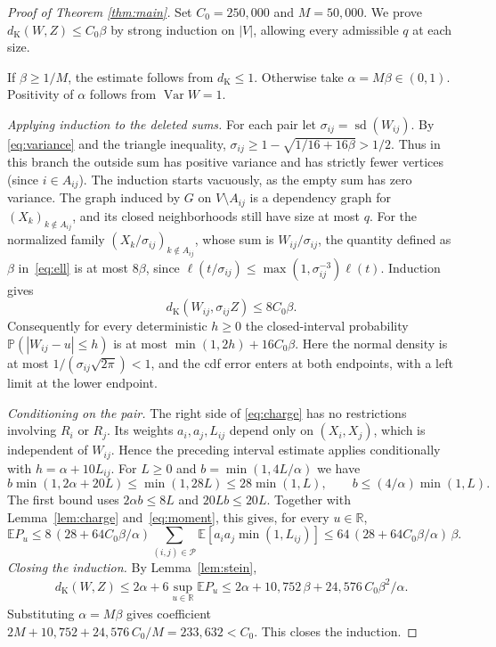 \documentclass[11pt,a4paper]{article}
\newcommand{\E}{\mathbb E}
\newcommand{\PP}{\mathbb P}
\newcommand{\R}{\mathbb R}
\newcommand{\Var}{\operatorname{Var}}
\newcommand{\sd}{\operatorname{sd}}
\newcommand{\dK}{d_{\mathrm K}}
\newcommand{\pairs}{\mathcal P}
\begin{document}
\begin{proof}[Proof of Theorem \ref{thm:main}]
Set $C_0=250{,}000$ and $M=50{,}000$. We prove $\dK(W,Z)\le C_0\beta$ by strong induction on $|V|$, allowing every admissible $q$ at each size.

If $\beta\ge1/M$, the estimate follows from $\dK\le1$. Otherwise take $\alpha=M\beta\in(0,1)$. Positivity of $\alpha$ follows from $\Var W=1$.

\emph{Applying induction to the deleted sums.}
For each pair let $\sigma_{ij}=\sd(W_{ij})$. By \eqref{eq:variance} and the triangle inequality, $\sigma_{ij}\ge1-\sqrt{1/16+16\beta}>1/2$. Thus in this branch the outside sum has positive variance and has strictly fewer vertices
(since $i\in A_{ij}$). The induction starts vacuously, as the empty sum has zero variance. The graph induced by $G$ on $V\setminus A_{ij}$ is a dependency graph for $(X_k)_{k\notin A_{ij}}$, and its closed neighborhoods still have size at most $q$. For the normalized family $(X_k/\sigma_{ij})_{k\notin A_{ij}}$, whose sum is $W_{ij}/\sigma_{ij}$, the quantity defined as $\beta$ in~\eqref{eq:ell} is at most $8\beta$, since $\ell(t/\sigma_{ij})\le\max(1,\sigma_{ij}^{-3})\ell(t)$. Induction gives
\[
 \dK(W_{ij},\sigma_{ij}Z)\le 8C_0\beta .
\]
Consequently for every deterministic $h\ge0$ the closed-interval probability $\PP(|W_{ij}-u|\le h)$ is at most $\min(1,2h)+16C_0\beta$. Here the normal density is at most $1/(\sigma_{ij}\sqrt{2\pi})<1$, and the cdf error enters at both endpoints, with a left limit at the lower endpoint.

\emph{Conditioning on the pair.}
The right side of \eqref{eq:charge} has no restrictions involving $R_i$ or $R_j$. Its weights $a_i,a_j,L_{ij}$ depend only on $(X_i,X_j)$, which is independent of $W_{ij}$. Hence the preceding interval estimate applies conditionally with $h=\alpha+10L_{ij}$. For $L\ge0$ and $b=\min(1,4L/\alpha)$ we have
\[
 b\min(1,2\alpha+20L)\le\min(1,28L)\le28\min(1,L),
 \qquad b\le (4/\alpha)\min(1,L).
\]
The first bound uses $2\alpha b\le8L$ and $20Lb\le20L$.
Together with Lemma~\ref{lem:charge} and~\eqref{eq:moment}, this gives, for every $u\in\R$,
\[
 \E P_u\le 8\,(28+64C_0\beta/\alpha)
 \sum_{(i,j)\in\pairs}\E[a_i a_j\min(1,L_{ij})]
 \le 64\,(28+64C_0\beta/\alpha)\,\beta .
\]
\emph{Closing the induction.} By Lemma~\ref{lem:stein},
\begin{align*}
 \dK(W,Z)
 \le 2\alpha+6\sup_{u\in\R}\E P_u
 \le 2\alpha+10{,}752\,\beta+24{,}576\, C_0\beta^2/\alpha .
\end{align*}
Substituting $\alpha=M\beta$ gives coefficient $2M+10{,}752+24{,}576\,C_0/M=233{,}632<C_0$. This closes the induction.
\end{proof}
\end{document}
